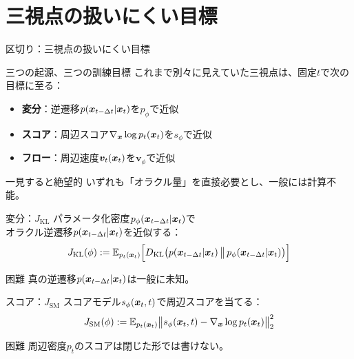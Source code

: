 \section{三視点の扱いにくい目標}
\asmain
\begin{frame}{区切り：三視点の扱いにくい目標}
    \tableofcontents[currentsection]
\end{frame}
\asmain
\begin{frame}{三つの起源、三つの訓練目標}
    これまで別々に見えていた三視点は、固定$t$で次の目標に至る：
    \begin{itemize}
        \item \textbf{変分}：逆遷移$p(\bm{x}_{t-\Delta t}|\bm{x}_t)$を$p_\phi$で近似
        \item \textbf{スコア}：周辺スコア$\nabla_{\bm{x}}\log p_t(\bm{x}_t)$を$s_\phi$で近似
        \item \textbf{フロー}：周辺速度$\bm{v}_t(\bm{x}_t)$を$\bm{v}_\phi$で近似
    \end{itemize}
    \begin{alertblock}{一見すると絶望的}
        いずれも「オラクル量」を直接必要とし、一般には計算不能。
    \end{alertblock}
\end{frame}
\asmain
\begin{frame}{変分：$J_{\mathrm{KL}}$}
    パラメータ化密度$p_\phi(\bm{x}_{t-\Delta t}|\bm{x}_t)$で\\
    オラクル逆遷移$p(\bm{x}_{t-\Delta t}|\bm{x}_t)$を近似する：
    \[
        J_{\mathrm{KL}}(\phi)
        :=
        \mathbb{E}_{p_t(\bm{x}_t)}
        \Bigl[
        D_{\mathrm{KL}}
        \bigl(
        p(\bm{x}_{t-\Delta t}|\bm{x}_t)
        \,\big\|\,
        p_\phi(\bm{x}_{t-\Delta t}|\bm{x}_t)
        \bigr)
        \Bigr]
    \]
    \begin{block}{困難}
        真の逆遷移$p(\bm{x}_{t-\Delta t}|\bm{x}_t)$は一般に未知。
    \end{block}
\end{frame}
\asmain
\begin{frame}{スコア：$J_{\mathrm{SM}}$}
    スコアモデル$s_\phi(\bm{x}_t,t)$で周辺スコアを当てる：
    \[
        J_{\mathrm{SM}}(\phi)
        :=
        \mathbb{E}_{p_t(\bm{x}_t)}
        \bigl\|
        s_\phi(\bm{x}_t,t)
        -
        \nabla_{\bm{x}}\log p_t(\bm{x}_t)
        \bigr\|_{2}^{2}
    \]
    \begin{block}{困難}
        周辺密度$p_t$のスコアは閉じた形では書けない。
    \end{block}
\end{frame}
